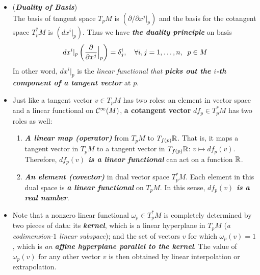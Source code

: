 \documentclass[11pt]{article}
\begin{document}
\begin{itemize}
\item \begin{remark} (\emph{\textbf{Duality of Basis}})\\
The basis of tangent space $T_pM$ is $(\partial / \partial x^j|_{p})$ and the basis for the cotangent space $T_p^{*}M$ is $(dx^{i}|_{p})$. Thus we have \emph{\textbf{the duality principle}} on basis
\begin{align}
dx^{i}|_{p}\left(\frac{\partial }{ \partial x^{j}}\Bigr|_{p}\right) = \delta_{j}^{i}, \quad \forall i,j =1,\ldots, n,\;\; p \in M \label{eqn: covector_field_coordinate_duality} 
\end{align} In other word, $dx^i |_p$ is the \emph{linear functional that \textbf{picks out the $i$-th component of a tangent vector}} at $p$. 
\end{remark}

\item \begin{remark}
Just like a tangent vector $v \in T_pM$ has two roles: an element in vector space and a linear functional on ${\mathcal C}^{\infty}(M)$,  \textbf{a cotangent vector} $df_{p} \in T_{p}^{*}M$ has two roles as well:
\begin{enumerate}
\item \emph{\textbf{A linear map (operator)}} from $T_pM$ to $T_{f(p)}{\mathbb R}$. That is, it maps a tangent vector in  $T_pM$ to a tangent vector in $T_{f(p)}{\mathbb R}$: $v \mapsto df_p(v)$. Therefore, \emph{\textbf{$df_p(v)$ is a linear functional}} can act on a function ${\mathbb R}$.
\item \emph{\textbf{An element (covector)}} in dual vector space $T_{p}^{*}M$. Each element in this dual space is \emph{\textbf{a linear functional}} on $T_pM$. In this sense, \emph{\textbf{$df_p(v)$ is a real number}}.
\end{enumerate}
\end{remark}

\item \begin{remark}
Note that a nonzero linear functional $\omega_{p} \in T_{p}^{*}M$ is completely determined by two pieces of data: its \emph{\textbf{kernel}}, which is a linear hyperplane in $T_{p}M$ (\emph{a codimension-$1$ linear subspace}); and the set of vectors $v$ for which $\omega_p(v) = 1$, which is \emph{an \textbf{affine hyperplane parallel to the kernel}}. The value of $\omega_{p}(v)$ for any other vector $v$ is then obtained by linear interpolation or extrapolation.
\end{remark}


\end{itemize}
\end{document}
